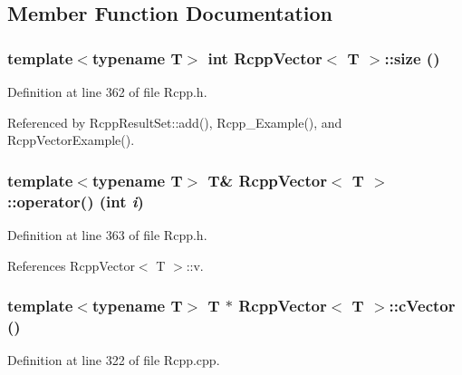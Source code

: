 \subsection{Member Function Documentation}
\hypertarget{classRcppVector_1e2424dc9b91014ba8b2c9351d97eb37}{
\subsubsection[size]{\setlength{\rightskip}{0pt plus 5cm}template$<$typename T$>$ int {\bf RcppVector}$<$ T $>$::size ()}}
\label{classRcppVector_1e2424dc9b91014ba8b2c9351d97eb37}




Definition at line 362 of file Rcpp.h.

Referenced by RcppResultSet::add(), Rcpp\_\-Example(), and RcppVectorExample().\hypertarget{classRcppVector_66aca1da0563af28e55768d98488a42d}{
\subsubsection[operator()]{\setlength{\rightskip}{0pt plus 5cm}template$<$typename T$>$ T\& {\bf RcppVector}$<$ T $>$::operator() (int {\em i})}}
\label{classRcppVector_66aca1da0563af28e55768d98488a42d}




Definition at line 363 of file Rcpp.h.

References RcppVector$<$ T $>$::v.\hypertarget{classRcppVector_f4660a27a888a51693b02d2f51b47b08}{
\subsubsection[cVector]{\setlength{\rightskip}{0pt plus 5cm}template$<$typename T$>$ T $\ast$ {\bf RcppVector}$<$ T $>$::cVector ()}}
\label{classRcppVector_f4660a27a888a51693b02d2f51b47b08}




Definition at line 322 of file Rcpp.cpp.


